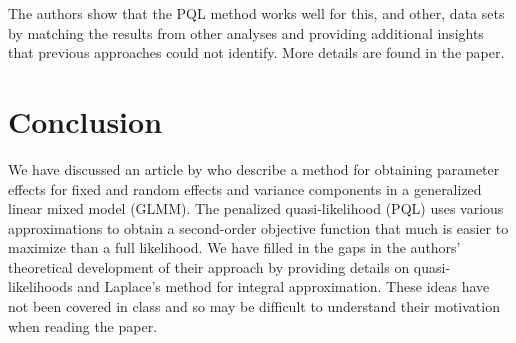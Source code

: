 \documentclass[12pt]{article}
\begin{document}
The authors show that the PQL method works well for this, and other, data sets by matching the results from other analyses and providing additional insights that previous approaches could not identify. More details are found in the paper.

\section{Conclusion}

We have discussed an article by \cite{breslow:1993} who describe a method for obtaining parameter effects for fixed and random effects and variance components in a generalized linear mixed model (GLMM). The penalized quasi-likelihood (PQL) uses various approximations to obtain a second-order objective function that much is easier to maximize than a full likelihood. We have filled in the gaps in the authors' theoretical development of their approach by providing details on quasi-likelihoods and Laplace's method for integral approximation. These ideas have not been covered in class and so may be difficult to understand their motivation when reading the paper.
\end{document}
